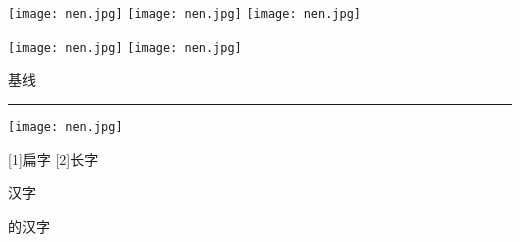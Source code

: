 \documentclass{ctexart}
\begin{document}
\texttt{[image: nen.jpg]}
\texttt{[image: nen.jpg]}
\texttt{[image: nen.jpg]}

\texttt{[image: nen.jpg]}
\texttt{[image: nen.jpg]}

    基线\rule{2cm}{0.4pt}%
    \texttt{[image: nen.jpg]}

    \scalebox{2}{大字}
    \scalebox{2}[1]{扁字}
    \scalebox{1}[2]{长字}

    \LARGE 汉字


    的汉字
\end{document}
